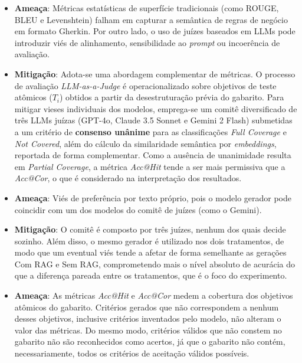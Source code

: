 \begin{itemize}
    \item \textbf{Ameaça}: Métricas estatísticas de superfície tradicionais (como ROUGE, BLEU e Levenshtein) falham em capturar a semântica de regras de negócio em formato Gherkin. Por outro lado, o uso de juízes baseados em LLMs pode introduzir viés de alinhamento, sensibilidade ao \textit{prompt} ou incoerência de avaliação.

    \item \textbf{Mitigação}: Adota-se uma abordagem complementar de métricas. O processo de avaliação \textit{LLM-as-a-Judge} é operacionalizado sobre objetivos de teste atômicos ($T_i$) obtidos a partir da desestruturação prévia do gabarito. Para mitigar vieses individuais dos modelos, emprega-se um comitê diversificado de três LLMs juízas (GPT-4o, Claude 3.5 Sonnet e Gemini 2 Flash) submetidas a um critério de \textbf{consenso unânime} para as classificações \textit{Full Coverage} e \textit{Not Covered}, além do cálculo da similaridade semântica por \textit{embeddings}, reportada de forma complementar. Como a ausência de unanimidade resulta em \textit{Partial Coverage}, a métrica \textit{Acc@Hit} tende a ser mais permissiva que a \textit{Acc@Cor}, o que é considerado na interpretação dos resultados.

    \item \textbf{Ameaça}: Viés de preferência por texto próprio, pois o modelo gerador pode coincidir com um dos modelos do comitê de juízes (como o Gemini).

    \item \textbf{Mitigação}: O comitê é composto por três juízes, nenhum dos quais decide sozinho. Além disso, o mesmo gerador é utilizado nos dois tratamentos, de modo que um eventual viés tende a afetar de forma semelhante as gerações Com RAG e Sem RAG, comprometendo mais o nível absoluto de acurácia do que a diferença pareada entre os tratamentos, que é o foco do experimento.

    \item \textbf{Ameaça}: As métricas \textit{Acc@Hit} e \textit{Acc@Cor} medem a cobertura dos objetivos atômicos do gabarito. Critérios gerados que não correspondem a nenhum desses objetivos, inclusive critérios inventados pelo modelo, não alteram o valor das métricas. Do mesmo modo, critérios válidos que não constem no gabarito não são reconhecidos como acertos, já que o gabarito não contém, necessariamente, todos os critérios de aceitação válidos possíveis.


\end{itemize}
